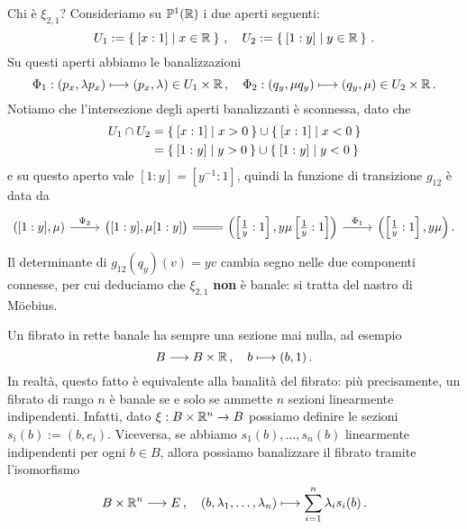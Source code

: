 \begin{ex!}
\begin{rmnumerate}
		Chi è $\xi_{2,1}$?
		Consideriamo su $\mathbb{P}^{1}({\mathbb R})$ i due aperti seguenti:
		\begin{equation*}
			U_{1} := \Set{ [x:1] | x \in {\mathbb R}}\,, \quad
			U_{2} := \Set{ [1:y] | y \in {\mathbb R}}\,.
		\end{equation*}
		Su questi aperti abbiamo le banalizzazioni
		\begin{equation*}
			\Phi_{1} : (p_{x}, \lambda p_{x} ) \longmapsto (p_{x}, \lambda) \in U_{1} \times {\mathbb R}\,,
			\quad \Phi_{2} : (q_{y}, \mu q_{y}) \longmapsto (q_{y},\mu) \in U_{2} \times {\mathbb R}\,.
		\end{equation*}
		Notiamo che l'intersezione degli aperti banalizzanti è sconnessa,
		dato che
		\begin{align*}
		 	U_{1} \cap U_{2} &= \Set{[x:1] | x>0 } \cup \Set{[x:1] | x<0 } \\
		 	&= \Set{[1:y] | y>0 } \cup \Set{[1:y] | y<0 }
		 \end{align*} 
		e su questo aperto vale $[1:y] = [y^{-1}:1]$, 
		quindi la funzione di transizione $g_{12}$ è data da
		\begin{equation*}
			\begin{tikzcd}
				({[1:y]},\mu) \ar[r, "\Psi_{2}"]
				& {\big({[1:y]}, \mu {[1:y]} \big)} \ar[r,equals]
				& {\left(\left[\frac{1}{y}:1 \right], y \mu \left[\frac{1}{y}:1 \right]\right)} 
				\ar[r, "\Phi_{1}"]
				& {\left(\left[\frac{1}{y}:1 \right], y \mu \right)} \,.
			\end{tikzcd}
		\end{equation*}
		Il determinante di $g_{12}(q_{y})(v) = yv$ cambia segno nelle due componenti
		connesse, per cui deduciamo che $\xi_{2,1}$ \textbf{non} è banale:
		si tratta del nastro di Möebius.
	\end{rmnumerate}
\end{ex!}


\begin{oss}
	Un fibrato in rette banale ha sempre una sezione mai nulla, ad esempio
	\begin{equation*}
		B \longrightarrow B \times {\mathbb R}\,,
		\quad b \longmapsto (b,1)\,.
	\end{equation*}
	In realtà, questo fatto è equivalente alla banalità del fibrato:
	più precisamente, un fibrato di rango $n$ è banale se e solo se ammette
	$n$ sezioni linearmente indipendenti.
	Infatti, dato $\xi:B \times {\mathbb R}^{n} \to B$ possiamo definire
	le sezioni $s_{i}(b) := (b, e_{i})$. Viceversa,
	se abbiamo $s_{1}(b), \dots, s_{n}(b)$ linearmente indipendenti per ogni $b \in B$,
	allora possiamo banalizzare il fibrato tramite l'isomorfismo
	\begin{equation*}
		B \times {\mathbb R}^{n} \longrightarrow E\,,
		\quad (b, \lambda_{1}, \dots, \lambda_{n}) \longmapsto \sum_{i=1}^{n}\lambda_{i}s_{i}(b)\,.
	\end{equation*}
\end{oss}


